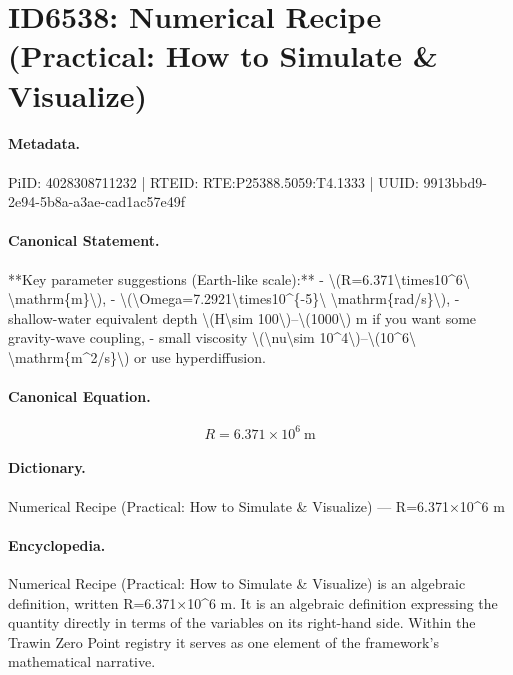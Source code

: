 \section*{ID6538: Numerical Recipe (Practical: How to Simulate \& Visualize)}
\paragraph{Metadata.}
PiID: 4028308711232 | RTEID: RTE:P25388.5059:T4.1333 | UUID: 9913bbd9-2e94-5b8a-a3ae-cad1ac57e49f

\paragraph{Canonical Statement.}
**Key parameter suggestions (Earth-like scale):** - \textbackslash{}(R=6.371\textbackslash{}times10\textasciicircum{}6\textbackslash{} \textbackslash{}mathrm\{m\}\textbackslash{}), - \textbackslash{}(\textbackslash{}Omega=7.2921\textbackslash{}times10\textasciicircum{}\{-5\}\textbackslash{} \textbackslash{}mathrm\{rad/s\}\textbackslash{}), - shallow-water equivalent depth \textbackslash{}(H\textbackslash{}sim 100\textbackslash{})–\textbackslash{}(1000\textbackslash{}) m if you want some gravity-wave coupling, - small viscosity \textbackslash{}(\textbackslash{}nu\textbackslash{}sim 10\textasciicircum{}4\textbackslash{})–\textbackslash{}(10\textasciicircum{}6\textbackslash{} \textbackslash{}mathrm\{m\textasciicircum{}2/s\}\textbackslash{}) or use hyperdiffusion.

\paragraph{Canonical Equation.}
\[
R=6.371\times10^6\ \mathrm{m}
\]

\paragraph{Dictionary.}
Numerical Recipe (Practical: How to Simulate \& Visualize) — R=6.371×10\textasciicircum{}6 m

\paragraph{Encyclopedia.}
Numerical Recipe (Practical: How to Simulate \& Visualize) is an algebraic definition, written R=6.371×10\textasciicircum{}6 m. It is an algebraic definition expressing the quantity directly in terms of the variables on its right-hand side. Within the Trawin Zero Point registry it serves as one element of the framework's mathematical narrative.
